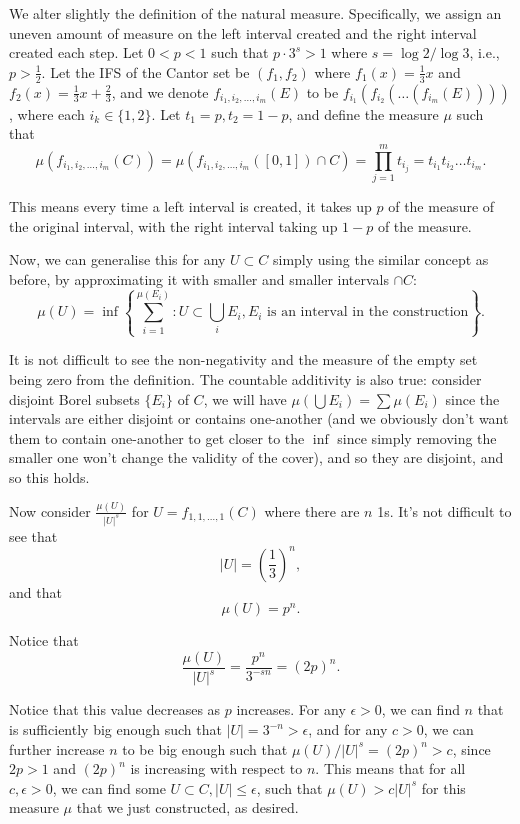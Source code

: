 We alter slightly the definition of the natural measure. Specifically, we assign an uneven amount of measure on the left interval created and the right interval created each step. Let \(0 < p < 1\) such that \(p \cdot 3^s > 1\) where \(s = \log 2 / \log 3\), i.e., \(p > \frac{1}{2}\). Let the IFS of the Cantor set be \((f_1, f_2)\) where \(f_1(x) = \frac{1}{3}x\) and \(f_2(x) = \frac{1}{3} x + \frac{2}{3}\), and we denote \(f_{i_1, i_2, \ldots, i_m} (E)\) to be \(f_{i_1}(f_{i_2}(\ldots(f_{i_m}(E))))\), where each \(i_k \in \{1, 2\}\). Let \(t_1 = p, t_2 = 1 - p\), and define the measure \(\mu\) such that
\[
\mu\left(f_{i_1, i_2, \ldots, i_m} (C)\right) = \mu\left(f_{i_1, i_2, \ldots, i_m} ([0, 1]) \cap C\right) = \prod_{j = 1}^{m} t_{i_j} = t_{i_1} t_{i_2} \ldots t_{i_m}.
\]

This means every time a left interval is created, it takes up \(p\) of the measure of the original interval, with the right interval taking up \(1 - p\) of the measure.

Now, we can generalise this for any \(U \subset C\) simply using the similar concept as before, by approximating it with smaller and smaller intervals \(\cap C\):
\[
\mu(U) = \inf\left\{\sum_{i = 1}^{\mu(E_i)} : U \subset \bigcup_{i} E_i, E_i \text{ is an interval in the construction}\right\}.
\]

It is not difficult to see the non-negativity and the measure of the empty set being zero from the definition. The countable additivity is also true: consider disjoint Borel subsets \(\{E_i\}\) of \(C\), we will have \(\mu (\bigcup E_i) = \sum \mu(E_i)\) since the intervals are either disjoint or contains one-another (and we obviously don't want them to contain one-another to get closer to the \(\inf\) since simply removing the smaller one won't change the validity of the cover), and so they are disjoint, and so this holds.

Now consider \(\frac{\mu(U)}{|U|^s}\) for \(U = f_{1, 1, \ldots, 1}(C)\) where there are \(n\) 1s. It's not difficult to see that
\[
|U| = \left(\frac{1}{3}\right)^n,
\]
and that
\[
\mu(U) = p^n.
\]

Notice that
\[
\frac{\mu(U)}{|U|^s} = \frac{p^n}{3^{-sn}} = (2p)^n.
\]

Notice that this value decreases as \(p\) increases. For any \(\epsilon > 0\), we can find \(n\) that is sufficiently big enough such that \(|U| = 3^{-n} > \epsilon\), and for any \(c > 0\), we can further increase \(n\) to be big enough such that \(\mu(U) / |U|^s = (2p)^n > c\), since \(2p > 1\) and \((2p)^n\) is increasing with respect to \(n\). This means that for all \(c, \epsilon > 0\), we can find some \(U \subset C, |U| \leq \epsilon\), such that \(\mu (U) > c|U|^s\) for this measure \(\mu\) that we just constructed, as desired.